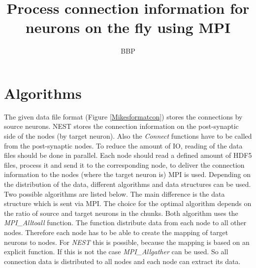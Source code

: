 \documentclass[a4paper]{article}
\title{Process connection information for neurons on the fly using MPI}
\author{BBP}
\begin{document}
   \maketitle


\section{Algorithms}
The given data file format (Figure \ref{Mikesformatcon}) stores the connections by source neurons.
NEST stores the connection information on the post-synaptic side of the nodes (by target neuron).
Also the \emph{Connect} functions have to be called from the post-synaptic nodes.
To reduce the amount of IO, reading of the data files should be done in parallel.
Each node should read a defined amount of HDF5 files, process it and send it to the corresponding node,
to deliver the connection information to the nodes (where the target neuron is) MPI is used.
Depending on the distribution of the data, different algorithms and data structures can be used.
Two possible algorithms are listed below. The main difference is the data structure which is sent via MPI.
The choice for the optimal algorithm depends on the ratio of source and target neurons in the chunks.
Both algorithm uses the \emph{MPI\_Alltoall} function. The function distribute data from each node to all other nodes.
Therefore each node has to be able to create the mapping of target neurons to nodes.
For \emph{NEST} this is possible, because the mapping is based on an explicit function.
If this is not the case \emph{MPI\_Allgather} can be used.
So all connection data is distributed to all nodes and each node can extract its data.
\end{document}

